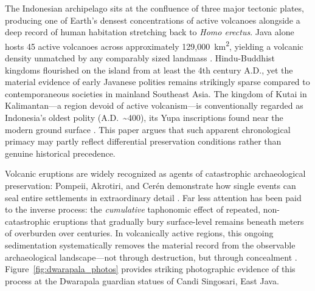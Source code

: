 \documentclass[12pt,letterpaper]{article}
\begin{document}
The Indonesian archipelago sits at the confluence of three major tectonic plates, producing one of Earth's densest concentrations of active volcanoes alongside a deep record of human habitation stretching back to \textit{Homo erectus}. Java alone hosts 45 active volcanoes across approximately 129,000~km\textsuperscript{2}, yielding a volcanic density unmatched by any comparably sized landmass \citep{vanbemmelen1949}. Hindu-Buddhist kingdoms flourished on the island from at least the 4th century A.D., yet the material evidence of early Javanese polities remains strikingly sparse compared to contemporaneous societies in mainland Southeast Asia. The kingdom of Kutai in Kalimantan---a region devoid of active volcanism---is conventionally regarded as Indonesia's oldest polity (A.D.~\textasciitilde 400), its Yupa inscriptions found near the modern ground surface \citep{vogel1918,coedes1968}. This paper argues that such apparent chronological primacy may partly reflect differential preservation conditions rather than genuine historical precedence.

Volcanic eruptions are widely recognized as agents of catastrophic archaeological preservation: Pompeii, Akrotiri, and Cer\'en demonstrate how single events can seal entire settlements in extraordinary detail \citep{sigurdsson1985,doumas1983,sheets1992}. Far less attention has been paid to the inverse process: the \textit{cumulative} taphonomic effect of repeated, non-catastrophic eruptions that gradually bury surface-level remains beneath meters of overburden over centuries. In volcanically active regions, this ongoing sedimentation systematically removes the material record from the observable archaeological landscape---not through destruction, but through concealment \citep{torrence2002,grattan2006}. Figure~\ref{fig:dwarapala_photos} provides striking photographic evidence of this process at the Dwarapala guardian statues of Candi Singosari, East Java.
\end{document}
